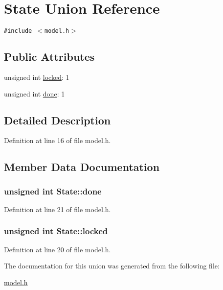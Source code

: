\hypertarget{unionState}{
\section{State Union Reference}
\label{unionState}
}
{\tt \#include $<$model.h$>$}

\subsection*{Public Attributes}
\begin{CompactItemize}
\item 
unsigned int \hyperlink{unionState_348faddd610e26a7c930c84e535edfe7}{locked}: 1
\item 
unsigned int \hyperlink{unionState_e3b8fdb5e29170f40c817a8cf8f5ff3e}{done}: 1
\end{CompactItemize}


\subsection{Detailed Description}


Definition at line 16 of file model.h.

\subsection{Member Data Documentation}
\hypertarget{unionState_e3b8fdb5e29170f40c817a8cf8f5ff3e}{
\subsubsection[{done}]{\setlength{\rightskip}{0pt plus 5cm}unsigned int {\bf State::done}}}
\label{unionState_e3b8fdb5e29170f40c817a8cf8f5ff3e}




Definition at line 21 of file model.h.\hypertarget{unionState_348faddd610e26a7c930c84e535edfe7}{
\subsubsection[{locked}]{\setlength{\rightskip}{0pt plus 5cm}unsigned int {\bf State::locked}}}
\label{unionState_348faddd610e26a7c930c84e535edfe7}




Definition at line 20 of file model.h.

The documentation for this union was generated from the following file:\begin{CompactItemize}
\item 
\hyperlink{model_8h}{model.h}\end{CompactItemize}

